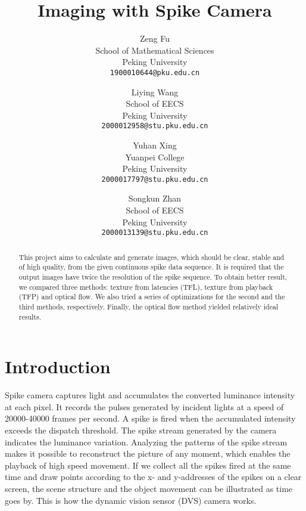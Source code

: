 \documentclass[10pt,twocolumn,letterpaper]{article}
\begin{document}
\title{Imaging with Spike Camera}

\author{Zeng Fu\\
School of Mathematical Sciences\\
Peking University\\
{\tt\small 1900010644@pku.edu.cn}
\and
Liying Wang\\
School of EECS\\
Peking University\\
{\tt\small 2000012958@stu.pku.edu.cn}\\
\and
Yuhan Xing\\
Yuanpei College\\
Peking University\\
{\tt\small 2000017797@stu.pku.edu.cn}
\and
Songkun Zhan\\
School of EECS\\
Peking University\\
{\tt\small 2000013139@stu.pku.edu.cn}
}
\maketitle
\begin{abstract}
  This project aims to calculate and generate images, which should be clear, stable and of high quality, from the given continuous spike data sequence. It is required that the output images have twice the resolution of the spike sequence. To obtain better result, we compared three methods: texture from latencies (TFL), texture from playback (TFP) and optical flow. We also tried a series of optimizations for the second and the third methods, respectively. Finally, the optical flow method yielded relatively ideal results.
\end{abstract}

\section{Introduction}
\label{sec:intro}

Spike camera captures light and accumulates the converted luminance intensity at each pixel. It records the pulses generated by incident lights at a speed of 20000-40000 frames per second. A spike is fired when the accumulated intensity exceeds the dispatch threshold. The spike stream generated by the camera indicates the luminance variation. Analyzing the patterns of the spike stream makes it possible to reconstruct the picture of any moment, which enables the playback of high speed movement. If we collect all the spikes fired at the same time and draw points according to the x- and y-addresses of the spikes on a clear screen, the scene structure and the object movement can be illustrated as time goes by. This is how the dynamic vision sensor (DVS) camera works.
\end{document}
